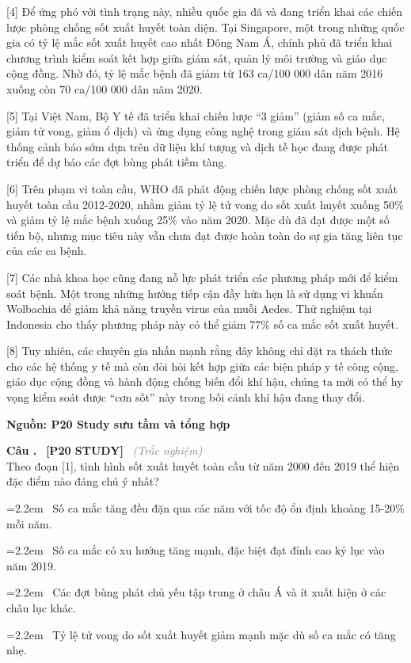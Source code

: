 \documentclass[12pt,a4paper,twoside]{article}
\newcounter{qcounter}
\newcommand{\question}[2][]{%
    \stepcounter{qcounter}%
    \par\vspace{5pt}%
    \noindent\textcolor{primaryBlue}{\textbf{Câu \theqcounter.}}~%
    \textcolor{secondaryBlue}{\small\textbf{[P20 STUDY]}}~%
    \if\relax\detokenize{#1}\relax\else\textcolor{gray}{\small\textit{(#1)}}~\fi\\[1pt]
    \noindent #2%
}
\newcommand{\choiceitem}[2]{%
    \tikz[baseline=-0.5ex]{
        \node[draw=primaryBlue, circle, minimum size=1.5em, inner sep=0pt, thick] {\textbf{#1}};
    }~#2%
}
\newenvironment{readingpassage}[1][]{%
    \begin{tcolorbox}[enhanced, colback=grayLight, colframe=secondaryBlue,
        coltitle=textDark, fonttitle=\bfseries, title={#1},
        rounded corners, arc=3mm, boxrule=1pt,
        left=15pt, right=15pt, top=10pt, bottom=10pt,
        breakable, before skip=10pt, after skip=10pt, drop fuzzy shadow]
    \setstretch{1.3}
}{\end{tcolorbox}}
\begin{document}
\begin{readingpassage}[]
[4] Để ứng phó với tình trạng này, nhiều quốc gia đã và đang triển khai các chiến lược phòng chống sốt xuất huyết toàn diện. Tại Singapore, một trong những quốc gia có tỷ lệ mắc sốt xuất huyết cao nhất Đông Nam Á, chính phủ đã triển khai chương trình kiểm soát kết hợp giữa giám sát, quản lý môi trường và giáo dục cộng đồng. Nhờ đó, tỷ lệ mắc bệnh đã giảm từ 163 ca/100 000 dân năm 2016 xuống còn 70 ca/100 000 dân năm 2020.

[5] Tại Việt Nam, Bộ Y tế đã triển khai chiến lược ``3 giảm'' (giảm số ca mắc, giảm tử vong, giảm ổ dịch) và ứng dụng công nghệ trong giám sát dịch bệnh. Hệ thống cảnh báo sớm dựa trên dữ liệu khí tượng và dịch tễ học đang được phát triển để dự báo các đợt bùng phát tiềm tàng.

[6] Trên phạm vi toàn cầu, WHO đã phát động chiến lược phòng chống sốt xuất huyết toàn cầu 2012-2020, nhằm giảm tỷ lệ tử vong do sốt xuất huyết xuống 50\% và giảm tỷ lệ mắc bệnh xuống 25\% vào năm 2020. Mặc dù đã đạt được một số tiến bộ, nhưng mục tiêu này vẫn chưa đạt được hoàn toàn do sự gia tăng liên tục của các ca bệnh.

[7] Các nhà khoa học cũng đang nỗ lực phát triển các phương pháp mới để kiểm soát bệnh. Một trong những hướng tiếp cận đầy hứa hẹn là sử dụng vi khuẩn Wolbachia để giảm khả năng truyền virus của muỗi Aedes. Thử nghiệm tại Indonesia cho thấy phương pháp này có thể giảm 77\% số ca mắc sốt xuất huyết.

[8] Tuy nhiên, các chuyên gia nhấn mạnh rằng đây không chỉ đặt ra thách thức cho các hệ thống y tế mà còn đòi hỏi kết hợp giữa các biện pháp y tế công cộng, giáo dục cộng đồng và hành động chống biến đổi khí hậu, chúng ta mới có thể hy vọng kiểm soát được ``cơn sốt'' này trong bối cảnh khí hậu đang thay đổi.

\hfill \textbf{Nguồn: P20 Study sưu tầm và tổng hợp}
\end{readingpassage}

\setcounter{qcounter}{0}
\question[Trắc nghiệm]{Theo đoạn [1], tình hình sốt xuất huyết toàn cầu từ năm 2000 đến 2019 thể hiện đặc điểm nào đáng chú ý nhất?}
\par\vspace{4pt}
\noindent\hangindent=2.2em\choiceitem{A}{Số ca mắc tăng đều đặn qua các năm với tốc độ ổn định khoảng 15-20\% mỗi năm.}\par\vspace{4pt}
\noindent\hangindent=2.2em\choiceitem{B}{Số ca mắc có xu hướng tăng mạnh, đặc biệt đạt đỉnh cao kỷ lục vào năm 2019.}\par\vspace{4pt}
\noindent\hangindent=2.2em\choiceitem{C}{Các đợt bùng phát chủ yếu tập trung ở châu Á và ít xuất hiện ở các châu lục khác.}\par\vspace{4pt}
\noindent\hangindent=2.2em\choiceitem{D}{Tỷ lệ tử vong do sốt xuất huyết giảm mạnh mặc dù số ca mắc có tăng nhẹ.}\par\vspace{4pt}
\end{document}

